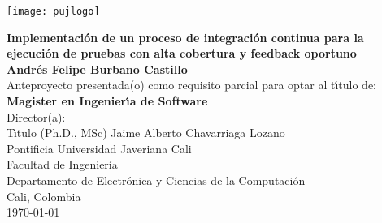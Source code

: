 \begin{center}
\thispagestyle{empty}
\vspace*{0cm}
\begin{center}
    \texttt{[image: pujlogo]}~\\[1.75cm]
\end{center}
\textbf{\huge
Implementación de un proceso de integración continua para la ejecución de pruebas con alta cobertura y feedback oportuno}\\[1.75cm]
\Large\textbf{Andrés Felipe Burbano Castillo}\\[1.5cm]
\small Anteproyecto presentada(o) como requisito parcial para optar al
t\'{\i}tulo de:\\
\textbf{Magister en Ingenier\'{\i}a de Software}\\[1.5cm]
Director(a):\\
T\'{\i}tulo (Ph.D., MSc) Jaime Alberto Chavarriaga Lozano\\[1.6cm]

Pontificia Universidad Javeriana Cali\\
Facultad de Ingeniería\\
Departamento de Electrónica y Ciencias de la Computación\\
Cali, Colombia\\
\today\\
\end{center}
